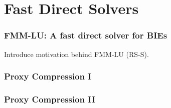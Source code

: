 \section{Fast Direct Solvers}

\begin{frame}
    \frametitle{FMM-LU: A fast direct solver for BIEs}
    Introduce motivation behind FMM-LU (RS-S).
\end{frame}


\begin{frame}
    \frametitle{Proxy Compression I}
\end{frame}

\begin{frame}

    \frametitle{Proxy Compression II}

\end{frame}

